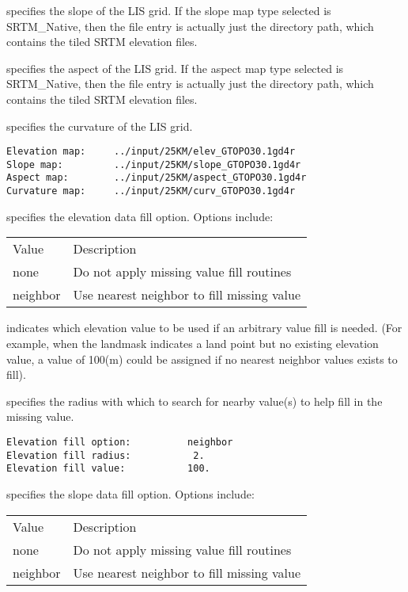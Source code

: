   specifies the slope of the LIS grid.
  If the slope map type selected is SRTM\_Native, then the
   file entry is actually just the directory path, which
   contains the tiled SRTM elevation files.

  specifies the aspect of the LIS grid.
  If the aspect map type selected is SRTM\_Native, then the
   file entry is actually just the directory path, which
   contains the tiled SRTM elevation files.

  specifies the curvature of the LIS grid.
 

 \begin{Verbatim}[frame=single]
Elevation map:     ../input/25KM/elev_GTOPO30.1gd4r
Slope map:         ../input/25KM/slope_GTOPO30.1gd4r
Aspect map:        ../input/25KM/aspect_GTOPO30.1gd4r
Curvature map:     ../input/25KM/curv_GTOPO30.1gd4r
 \end{Verbatim}

 
  specifies the elevation
 data fill option.  Options include:

 \begin{tabular}{ll}
 Value    & Description                                \\
 none     & Do not apply missing value fill routines   \\
 neighbor & Use nearest neighbor to fill missing value \\
 \end{tabular}

  indicates which elevation
 value to be used if an arbitrary value fill is needed. 
 (For example, when the landmask indicates a land point but no existing 
 elevation value, a value of 100(m) could be assigned if 
 no nearest neighbor values exists to fill).

  specifies the radius with which
 to search for nearby value(s) to help fill in the missing value.
 

 \begin{Verbatim}[frame=single]
Elevation fill option:          neighbor
Elevation fill radius:           2.
Elevation fill value:           100.
 \end{Verbatim}

 
  specifies the slope
 data fill option.  Options include:

 \begin{tabular}{ll}
 Value    & Description                                \\
 none     & Do not apply missing value fill routines   \\
 neighbor & Use nearest neighbor to fill missing value \\
 \end{tabular}

